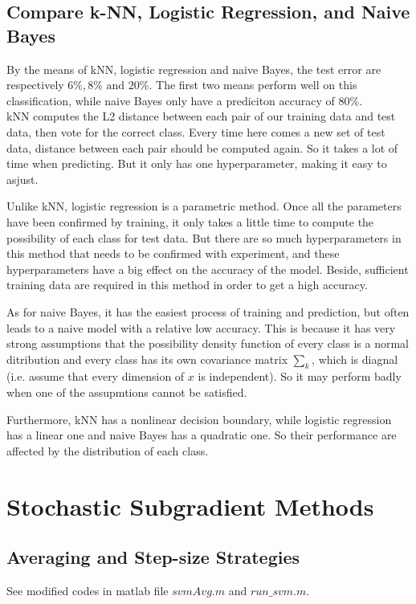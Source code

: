 \documentclass{article}
\begin{document}
\subsection{Compare k-NN, Logistic Regression, and Naive Bayes}

By the means of kNN, logistic regression and naive Bayes, the test error are respectively $6\%, 8\% \text{ and } 20\%$. The first two means perform well on this classification, while naive Bayes only have a prediciton accuracy of $80\%$.\\

kNN computes the L2 distance between each pair of our training data and test data, then vote for the correct class. Every time here comes a new set of test data, distance between each pair should be computed again. So it takes a lot of time when predicting. But it only has one hyperparameter, making it easy to asjust.

Unlike kNN, logistic regression is a parametric method. Once all the parameters have been confirmed by training, it only takes a little time to compute the possibility of each class for test data. But there are so much hyperparameters in this method that needs to be confirmed with experiment, and these hyperparameters have a big effect on the accuracy of the model. Beside, sufficient training data are required in this method in order to get a high accuracy.

As for naive Bayes, it has the easiest process of training and prediction, but often leads to a naive model with a relative low 
accuracy. This is because it has very strong assumptions that the possibility density function of every class is a normal ditribution and every class has its own covariance matrix $\sum_k$, which is diagnal (i.e. assume that every dimension of $x$ is independent). So it may perform badly when one of the assupmtions cannot be satisfied.

Furthermore, kNN has a nonlinear decision boundary, while logistic regression has a linear one and naive Bayes has a quadratic one. So their performance are affected by the distribution of each class.

\section{Stochastic Subgradient Methods}
\subsection{Averaging and Step-size Strategies}
See modified codes in matlab file $svmAvg.m$ and $run\_svm.m$.\\
\end{document}
